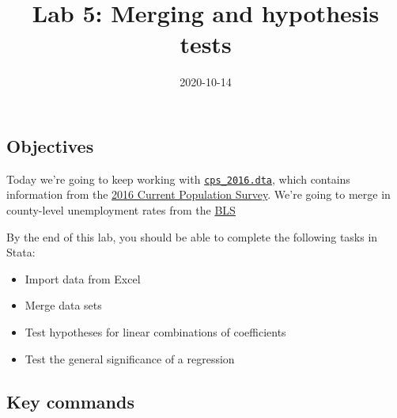 \documentclass[
]{article}
\title{Lab 5: Merging and hypothesis tests}
\author{}
\date{2020-10-14}
\begin{document}
\maketitle



\hypertarget{objectives}{%
\subsection*{Objectives}\label{objectives}}

Today we're going to keep working with
\href{../materials/cps_2016.dta}{\texttt{cps\_2016.dta}}, which contains
information from the \href{https://cps.ipums.org/cps/}{2016 Current
Population Survey}. We're going to merge in county-level unemployment
rates from the \href{https://www.bls.gov/lau/tables.htm}{BLS}

By the end of this lab, you should be able to complete the following
tasks in Stata:

\begin{itemize}
\item
  Import data from Excel
\item
  Merge data sets
\item
  Test hypotheses for linear combinations of coefficients
\item
  Test the general significance of a regression
\end{itemize}

\hypertarget{key-commands}{%
\subsection*{Key commands}\label{key-commands}}
\end{document}
